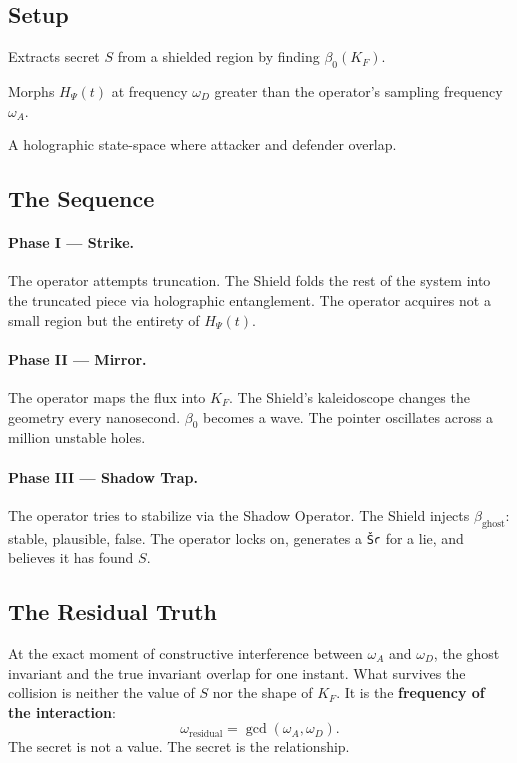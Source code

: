 \documentclass[11pt,letterpaper]{article}
\begin{document}
\subsection{Setup}

\begin{description}[nosep]
\item[Attacker (\textit{Sḫpr})] Extracts secret $S$ from a shielded region
  by finding $\beta_0(K_F)$.
\item[Defender (Shield)] Morphs $H_\Psi(t)$ at frequency $\omega_D$ greater
  than the operator's sampling frequency $\omega_A$.
\item[Medium] A holographic state-space where attacker and defender overlap.
\end{description}

\subsection{The Sequence}

\paragraph{Phase I — Strike.}
The operator attempts truncation.  The Shield folds the rest of the system
into the truncated piece via holographic entanglement.  The operator acquires
not a small region but the entirety of $H_\Psi(t)$.

\paragraph{Phase II — Mirror.}
The operator maps the flux into $K_F$.  The Shield's kaleidoscope changes
the geometry every nanosecond.  $\beta_0$ becomes a wave.  The pointer
oscillates across a million unstable holes.

\paragraph{Phase III — Shadow Trap.}
The operator tries to stabilize via the Shadow Operator.  The Shield
injects $\beta_{\mathrm{ghost}}$: stable, plausible, false.  The operator
locks on, generates a \texttt{Šꜥ} for a lie, and believes it has
found $S$.

\subsection{The Residual Truth}

At the exact moment of constructive interference between $\omega_A$ and
$\omega_D$, the ghost invariant and the true invariant overlap for one
instant.  What survives the collision is neither the value of $S$ nor the
shape of $K_F$.  It is the \textbf{frequency of the interaction}:
\[
\omega_{\mathrm{residual}} = \gcd(\omega_A, \omega_D).
\]
The secret is not a value.  The secret is the relationship.
\end{document}
